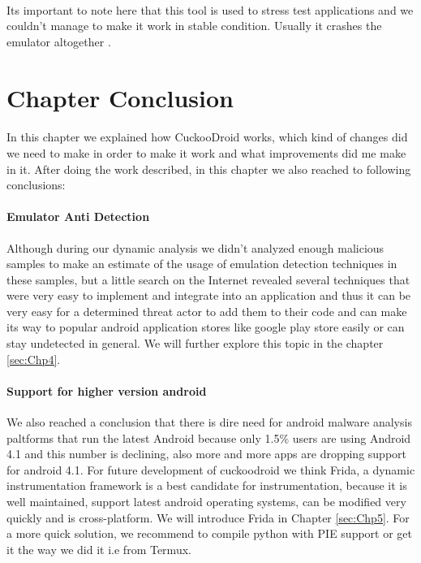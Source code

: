 \documentclass[../main.tex]{subfile}
\begin{document}
		\paragraph{} Its important to note here that this tool is used to stress test applications and we couldn't manage to make it work in stable condition. Usually it crashes the emulator altogether \cite{issue52}.
		
		\section{Chapter Conclusion}
		\paragraph{} In this chapter we explained how CuckooDroid works, which kind of changes did we need to make in order to make it work and what improvements did me make in it. After doing the work described, in this chapter we also reached to following conclusions:
		\paragraph{Emulator Anti Detection} Although during our dynamic analysis we didn't analyzed enough malicious samples to make an estimate of the usage of emulation detection techniques in these samples, but a little search on the Internet revealed several techniques that were very easy to implement and integrate into an application and thus it can be very easy for a determined threat actor to add them to their code and can make its way to popular android application stores like google play store easily or can stay undetected in general. We will further explore this topic in the chapter \ref{sec:Chp4}.
		
		\paragraph{Support for higher version android} We also reached a conclusion that there is dire need for android malware analysis paltforms that run the latest Android because only 1.5\% users are using Android 4.1 \cite{distribution_dashboard} and this number is declining, also more and more apps are dropping support for android 4.1. For future development of cuckoodroid we think Frida, a dynamic instrumentation framework is a best candidate for instrumentation, because it is well maintained, support latest android operating systems, can be modified very quickly and is cross-platform. We will introduce Frida in Chapter \ref{sec:Chp5}. For a more quick solution, we recommend to compile python with PIE support or get it the way we did it i.e from Termux.
		
\end{document}
